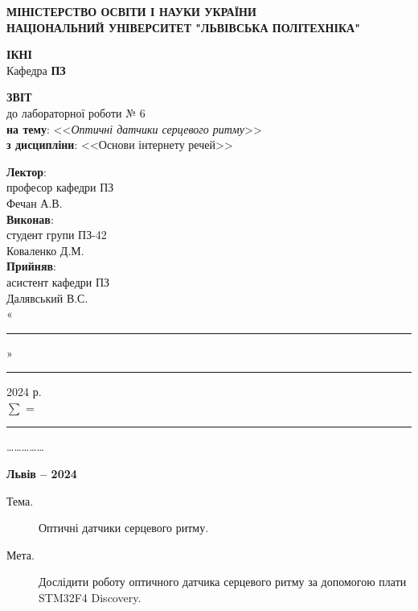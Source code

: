 \documentclass[oneside,14pt]{extarticle}
\newcommand\subject{Основи інтернету речей}
\newcommand\lecturer{професор кафедри ПЗ\\Фечан А.В.}
\newcommand\teacher{асистент кафедри ПЗ\\Далявський В.С.}
\newcommand\mygroup{ПЗ-42}
\newcommand\lab{6}
\newcommand\theme{Оптичні датчики серцевого ритму}
\newcommand\purpose{Дослідити роботу оптичного датчика серцевого ритму за допомогою плати
	STM32F4 Discovery}
\begin{document}
\begin{normalsize}
	\begin{titlepage}
		\thispagestyle{empty}
		\begin{center}
			\textbf{МІНІСТЕРСТВО ОСВІТИ І НАУКИ УКРАЇНИ\\
				НАЦІОНАЛЬНИЙ УНІВЕРСИТЕТ "ЛЬВІВСЬКА ПОЛІТЕХНІКА"}
		\end{center}
		\begin{flushright}
			\textbf{ІКНІ}\\
			Кафедра \textbf{ПЗ}
		\end{flushright}
		\vspace{80pt}
		\begin{center}
			\textbf{ЗВІТ}\\
			\vspace{10pt}
			до лабораторної роботи № \lab\\
			\textbf{на тему}: <<\textit{\theme}>>\\
			\textbf{з дисципліни}: <<\subject>>
		\end{center}
		\vspace{80pt}
		\begin{flushright}
			
			\textbf{Лектор}:\\
			\lecturer\\
			\vspace{28pt}
			\textbf{Виконав}:\\
			
			студент групи \mygroup\\
			Коваленко Д.М.\\
			\vspace{28pt}
			\textbf{Прийняв}:\\
			
			\teacher\\
			
			\vspace{28pt}
			«\rule{1cm}{0.15mm}» \rule{1.5cm}{0.15mm} 2024 р.\\
			$\sum$ = \rule{1cm}{0.15mm}……………\\
			
		\end{flushright}
		\vspace{\fill}
		\begin{center}
			\textbf{Львів – 2024}
		\end{center}
	\end{titlepage}
		
	\begin{description}
		\item[Тема.] \theme.
		\item[Мета.] \purpose.
	\end{description}


\end{normalsize}
\end{document}
